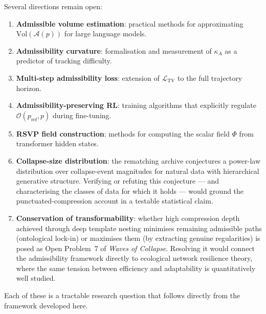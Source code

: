 \documentclass[11pt, a4paper, openany]{book}
\theoremstyle{plain}
\theoremstyle{definition}
\theoremstyle{remark}
\newcommand{\Vol}{\mathrm{Vol}}
\begin{document}
Several directions remain open:

\begin{enumerate}
  \item \textbf{Admissible volume estimation}: practical methods for
    approximating $\Vol(\mathcal{A}(p))$ for large language models.
  \item \textbf{Admissibility curvature}: formalisation and measurement
    of $\kappa_A$ as a predictor of tracking difficulty.
  \item \textbf{Multi-step admissibility loss}: extension of
    $\mathcal{L}_{\mathrm{TV}}$ to the full trajectory horizon.
  \item \textbf{Admissibility-preserving RL}: training algorithms that
    explicitly regulate $\mathcal{O}(p_{\mathrm{ref}}, p)$ during fine-tuning.
  \item \textbf{RSVP field construction}: methods for computing the scalar
    field $\Phi$ from transformer hidden states.
  \item \textbf{Collapse-size distribution}: the rematching archive
    \cite{flyxion2026waves} conjectures a power-law distribution over collapse-event
    magnitudes for natural data with hierarchical generative structure.
    Verifying or refuting this conjecture --- and characterising the classes
    of data for which it holds --- would ground the punctuated-compression account
    in a testable statistical claim.
  \item \textbf{Conservation of transformability}: whether high compression
    depth achieved through deep template nesting minimises remaining admissible
    paths (ontological lock-in) or maximises them (by extracting genuine
    regularities) is posed as Open Problem~7 of \emph{Waves of Collapse}.
    Resolving it would connect the admissibility framework directly to
    ecological network resilience theory, where the same tension between
    efficiency and adaptability is quantitatively well studied.
\end{enumerate}

Each of these is a tractable research question that follows directly from
the framework developed here.

\backmatter
\end{document}
